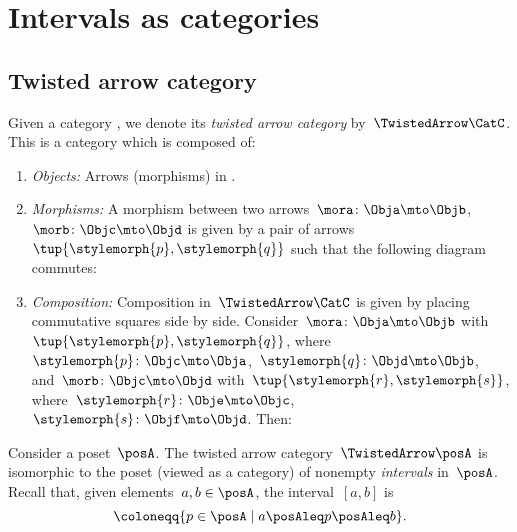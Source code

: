 
\section{Intervals as categories}

\subsection{Twisted arrow category}

\begin{ctdefinition}
	\label{def:twisted-arrow-category}
	\label{def:twisted-arrow}
	Given a category \CatC, we denote its \emph{twisted arrow category} by~$\TwistedArrow\CatC$.
	This is a category which is composed of:
	\begin{enumerate}
		\item \emph{Objects:} Arrows (morphisms) in \CatC.
		\item \emph{Morphisms:}
		      A morphism between two arrows~$\mora\colon \Obja \mto \Objb $,~$\morb\colon \Objc \mto \Objd$ is given by a pair of arrows~$\tup{\stylemorph{p},\stylemorph{q}}$ such that the following diagram commutes:
		      \begin{center}
		      \end{center}
		\item \emph{Composition:} Composition in~$\TwistedArrow\CatC$ is given by placing commutative squares side by side.
		      Consider~$\mora\colon \Obja \mto \Objb$ with~$\tup{\stylemorph{p},\stylemorph{q}}$, where~$\stylemorph{p}\colon \Objc\mto \Obja$,~$\stylemorph{q}\colon \Objd \mto \Objb$, and~$\morb\colon \Objc \mto \Objd$ with~$\tup{\stylemorph{r},\stylemorph{s}}$, where~$\stylemorph{r}\colon \Obje\mto \Objc$,~$\stylemorph{s}\colon \Objf \mto \Objd$.
		      Then:
		      \begin{center}
		      \end{center}
	\end{enumerate}
\end{ctdefinition}


\begin{example}[Intervals]
	\label{exa:twisted-arrow-poset}
	Consider a poset~$\posA$.
	The twisted arrow category~$\TwistedArrow \posA$ is isomorphic to the poset (viewed as a category) of nonempty \emph{intervals} in~$\posA$.
	Recall that, given elements~$a, b \in \posA$, the interval~$[a,b]$ is
	\begin{equation*}
		[a,b]
		\coloneqq \{p \in \posA \mid a\posAleq p \posAleq b\}.
	\end{equation*}
\end{example}

